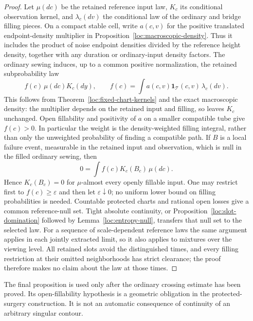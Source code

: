 \begin{proof}
Let $\mu(dc)$ be the retained reference input law, $K_c$ its conditional
observation kernel, and $\lambda_c(dv)$ the conditional law of the
ordinary and bridge filling pieces.  On a compact stable cell, write
$a(c,v)$ for the positive translated endpoint-density multiplier in
Proposition~\ref{loc:macroscopic-density}.  Thus it includes the
product of noise endpoint densities divided by the reference height
density, together with any duration or ordinary-input density factors.
The ordinary sewing induces, up to a common positive normalization,
the retained subprobability law
\[
 f(c)\,\mu(dc)K_c(dy),\qquad
 f(c)=\int a(c,v)\mathbf1_{\mathcal T}(c,v)\,\lambda_c(dv).
\]
This follows from Theorem~\ref{loc:fixed-chart-kernels} and the exact
macroscopic density: the multiplier depends on the retained input and
filling, so leaves $K_c$ unchanged.  Open fillability and positivity of
$a$ on a smaller compatible tube give $f(c)>0$.  In particular the
weight is the density-weighted filling integral, rather than only the
unweighted probability of finding a compatible path.  If $B$ is a local
failure event, measurable in the retained input and observation, which
is null in the filled ordinary sewing, then
\[
 0=\int f(c)K_c(B_c)\,\mu(dc).
\]
Hence $K_c(B_c)=0$ for $\mu$-almost every openly fillable input.
One may restrict first to $f(c)\ge\varepsilon$ and then let
$\varepsilon\downarrow0$; no uniform lower bound on filling
probabilities is needed.  Countable protected charts and rational open
losses give a common reference-null set.  Tight absolute continuity,
or Proposition~\ref{loc:slot-domination} followed by
Lemma~\ref{loc:entropy-null}, transfers that null set to the selected
law.  For a sequence of scale-dependent reference laws the same argument
applies in each jointly extracted limit, so it also applies to mixtures
over the viewing level.  All retained slots avoid the distinguished
times, and every filling restriction at their omitted neighborhoods has
strict clearance; the proof therefore makes no claim about the law at
those times.
\end{proof}

The final proposition is used only after the ordinary crossing estimate
has been proved.  Its open-fillability hypothesis is a geometric
obligation in the protected-surgery construction.  It is not an
automatic consequence of continuity of an arbitrary singular contour.
